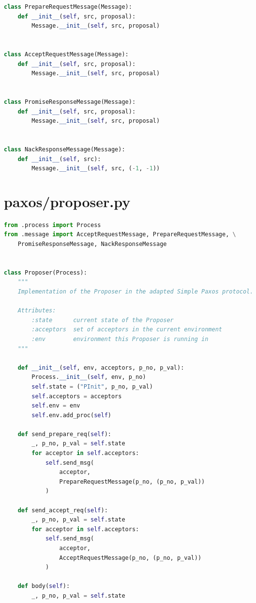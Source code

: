 \begin{landscape}
\begin{multicols*}{2}
\begin{lstlisting}[language=Python]
class PrepareRequestMessage(Message):
    def __init__(self, src, proposal):
        Message.__init__(self, src, proposal)


class AcceptRequestMessage(Message):
    def __init__(self, src, proposal):
        Message.__init__(self, src, proposal)


class PromiseResponseMessage(Message):
    def __init__(self, src, proposal):
        Message.__init__(self, src, proposal)


class NackResponseMessage(Message):
    def __init__(self, src):
        Message.__init__(self, src, (-1, -1))
\end{lstlisting}
\end{multicols*}

\newpage


\section{paxos/proposer.py}
\begin{multicols*}{2}
\begin{lstlisting}[language=Python]
from .process import Process
from .message import AcceptRequestMessage, PrepareRequestMessage, \
    PromiseResponseMessage, NackResponseMessage


class Proposer(Process):
    """
    Implementation of the Proposer in the adapted Simple Paxos protocol.

    Attributes:
        :state      current state of the Proposer
        :acceptors  set of acceptors in the current environment
        :env        environment this Proposer is running in
    """

    def __init__(self, env, acceptors, p_no, p_val):
        Process.__init__(self, env, p_no)
        self.state = ("PInit", p_no, p_val)
        self.acceptors = acceptors
        self.env = env
        self.env.add_proc(self)

    def send_prepare_req(self):
        _, p_no, p_val = self.state
        for acceptor in self.acceptors:
            self.send_msg(
                acceptor,
                PrepareRequestMessage(p_no, (p_no, p_val))
            )

    def send_accept_req(self):
        _, p_no, p_val = self.state
        for acceptor in self.acceptors:
            self.send_msg(
                acceptor,
                AcceptRequestMessage(p_no, (p_no, p_val))
            )

    def body(self):
        _, p_no, p_val = self.state


\end{lstlisting}
\end{multicols*}
\end{landscape}
